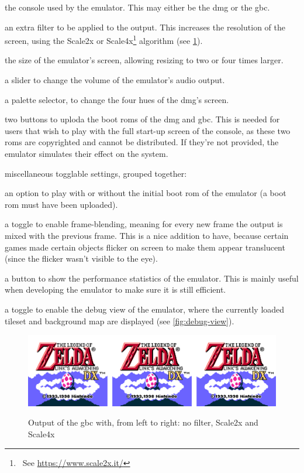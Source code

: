 \documentclass[11pt]{informatics-report}
\newcommand{\ftnt}[1]{\footnote{~See \url{#1}}}
\begin{document}
\begin{compactitem}
	\item the console used by the emulator. This may either be the \gls{dmg} or the \gls{gbc}.
	\item an extra filter to be applied to the output. This increases the resolution of the screen, using the Scale2x or Scale4x\ftnt{https://www.scale2x.it/} algorithm (see \ref{fig:scale-filter}).
	\item the size of the emulator's screen, allowing resizing to two or four times larger.
	\item a slider to change the volume of the emulator's audio output.
	\item a palette selector, to change the four hues of the \gls{dmg}'s screen.
	\item two buttons to uploda the boot \glspl{rom} of the \gls{dmg} and \gls{gbc}. This is needed for users that wish to play with the full start-up screen of the console, as these two \glspl{rom} are copyrighted and cannot be distributed. If they're not provided, the emulator simulates their effect on the system.
	\item miscellaneous togglable settings, grouped together:
	\begin{compactitem}
		\item an option to play with or without the initial boot \gls{rom} of the emulator (a boot \gls{rom} must have been uploaded).
		\item a toggle to enable frame-blending, meaning for every new frame the output is mixed with the previous frame. This is a nice addition to have, because certain games made certain objects flicker on screen to make them appear translucent (since the flicker wasn't visible to the eye).
		\item a button to show the performance statistics of the emulator. This is mainly useful when developing the emulator to make sure it is still efficient.
		\item a toggle to enable the debug view of the emulator, where the currently loaded tileset and background map are displayed (see \ref{fig:debug-view}).
	\end{compactitem}
\end{compactitem}

\begin{figure}[h]
    \centering
    \includegraphics[width=15cm]{images/scale-filter}\\
    \caption{Output of the \gls{gbc} with, from left to right: no filter, Scale2x and Scale4x}
    \label{fig:scale-filter}
\end{figure}
\end{document}
